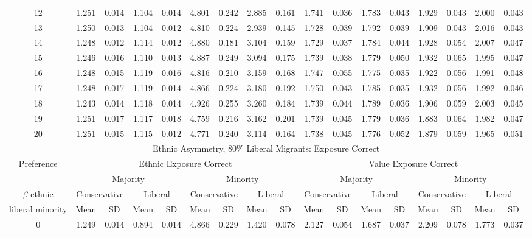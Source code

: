 \documentclass{article}
\begin{document}
\begin{table}[H]
{\begin{tabular}{|c|c|c|c|c|c|c|c|c|c|c|c|c|c|c|c|c|}
    12 & 1.251 & 0.014 & 1.104 & 0.014 & 4.801 & 0.242 & 2.885 & 0.161 & 1.741 & 0.036 & 1.783 & 0.043 & 1.929 & 0.043 & 2.000 & 0.043 \\ 
    13 & 1.250 & 0.013 & 1.104 & 0.012 & 4.810 & 0.224 & 2.939 & 0.145 & 1.728 & 0.039 & 1.792 & 0.039 & 1.909 & 0.043 & 2.016 & 0.043 \\ 
    14 & 1.248 & 0.012 & 1.114 & 0.012 & 4.880 & 0.181 & 3.104 & 0.159 & 1.729 & 0.037 & 1.784 & 0.044 & 1.928 & 0.054 & 2.007 & 0.047 \\ 
    15 & 1.246 & 0.016 & 1.110 & 0.013 & 4.887 & 0.249 & 3.094 & 0.175 & 1.739 & 0.038 & 1.779 & 0.050 & 1.932 & 0.065 & 1.995 & 0.047 \\ 
    16 & 1.248 & 0.015 & 1.119 & 0.016 & 4.816 & 0.210 & 3.159 & 0.168 & 1.747 & 0.055 & 1.775 & 0.035 & 1.922 & 0.056 & 1.991 & 0.048 \\ 
    17 & 1.248 & 0.017 & 1.119 & 0.014 & 4.866 & 0.224 & 3.180 & 0.192 & 1.750 & 0.043 & 1.785 & 0.035 & 1.932 & 0.056 & 1.992 & 0.046 \\ 
    18 & 1.243 & 0.014 & 1.118 & 0.014 & 4.926 & 0.255 & 3.260 & 0.184 & 1.739 & 0.044 & 1.789 & 0.036 & 1.906 & 0.059 & 2.003 & 0.045 \\ 
    19 & 1.251 & 0.017 & 1.117 & 0.018 & 4.759 & 0.216 & 3.162 & 0.201 & 1.739 & 0.045 & 1.779 & 0.036 & 1.883 & 0.064 & 1.982 & 0.047 \\ 
    20 & 1.251 & 0.015 & 1.115 & 0.012 & 4.771 & 0.240 & 3.114 & 0.164 & 1.738 & 0.045 & 1.776 & 0.052 & 1.879 & 0.059 & 1.965 & 0.051 \\ 
     \hline
  \multicolumn{17}{|c|}{Ethnic Asymmetry, $80 \%$ Liberal Migrants: Exposure Correct}  \\\hline
 Preference &  \multicolumn{8}{|c|}{Ethnic Exposure Correct} & \multicolumn{8}{|c|}{Value Exposure Correct}   \\\hline
 & \multicolumn{4}{|c|}{Majority} & \multicolumn{4}{|c|}{Minority}  & \multicolumn{4}{|c|}{Majority} & \multicolumn{4}{|c|}{Minority}  \\
 $\beta$ ethnic & \multicolumn{2}{|c|}{Conservative} & \multicolumn{2}{|c|}{Liberal} 
& \multicolumn{2}{|c|}{Conservative} & \multicolumn{2}{|c|}{Liberal} & \multicolumn{2}{|c|}{Conservative} & \multicolumn{2}{|c|}{Liberal} 
& \multicolumn{2}{|c|}{Conservative} & \multicolumn{2}{|c|}{Liberal}\\
 liberal minority & Mean & SD & Mean & SD & Mean & SD & Mean & SD & Mean & SD & Mean & SD & Mean & SD & Mean & SD\\
 \hline
   0 & 1.249 & 0.014 & 0.894 & 0.014 & 4.866 & 0.229 & 1.420 & 0.078 & 2.127 & 0.054 & 1.687 & 0.037 & 2.209 & 0.078 & 1.773 & 0.037 \\ 

\end{tabular}}
\end{table}
\end{document}
